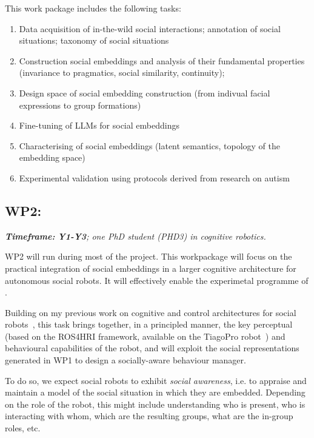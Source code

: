 This work package includes the following tasks:

\begin{enumerate}[label=\textbf{T1.\arabic*}]
    \item Data acquisition of in-the-wild social interactions; annotation of
        social situations; taxonomy of social situations
    \item Construction social embeddings and analysis of their fundamental
        properties (invariance to pragmatics, social similarity, continuity);
    \item Design space of social embedding construction (from indivual facial
        expressions to group formations)
    \item Fine-tuning of LLMs for social embeddings
    \item Characterising of social embeddings (latent semantics, topology of the
        embedding space)
    \item Experimental validation using protocols derived from research on
        autism
\end{enumerate}

\subsection{WP2: \textbf{\wpTwo}}

\emph{    \textbf{Timeframe:} \textbf{Y1-Y3}; one PhD student (PHD3) in cognitive
    robotics.}


WP2 will run during most of the project. This workpackage will focus on the
practical integration of social embeddings in a larger cognitive architecture
for autonomous social robots. It will effectively enable the experimetal
programme of \project.

Building on my previous work on cognitive and control architectures for social
robots~\cite{lemaignan2017artificial,lemaignan2015pyrobots,baxter2016cognitive,lemaignan2014challenges,lemaignan2011what},
this task brings together, in a principled manner, the key perceptual (based on
the ROS4HRI framework, available on the TiagoPro robot~\cite{ros2023ros4hri})
and behavioural capabilities of the robot, and will exploit the social
representations generated in WP1 to design a socially-aware behaviour manager.

To do so, we expect social robots to exhibit \emph{social
awareness}, i.e. to appraise and maintain a model of the social situation in
which they are embedded. Depending on the role of the robot, this might include
understanding who is present, who is interacting with whom, which are the
resulting groups, what are the in-group roles,  etc.



